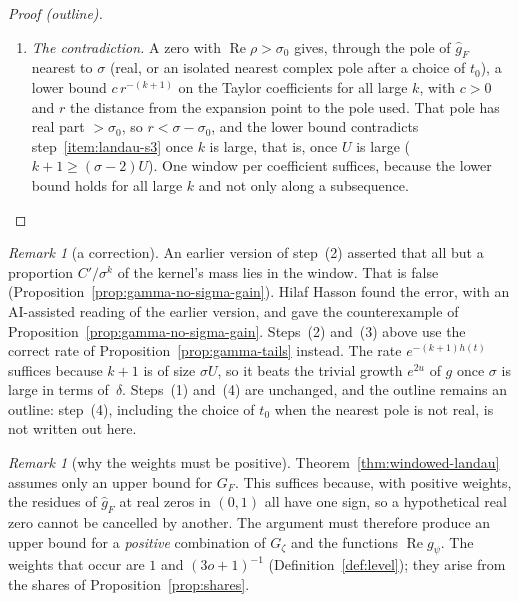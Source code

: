 \documentclass[11pt]{amsbook}
\theoremstyle{plain}
\theoremstyle{definition}
\theoremstyle{remark}
\newtheorem{remark}[theorem]{Remark}
\numberwithin{equation}{section}
\numberwithin{figure}{chapter}
\numberwithin{table}{chapter}
\newcommand{\Gz}{G_{\zeta}}
\begin{document}
\begin{proof}[Proof (outline)]
\begin{enumerate}[label=(\arabic*)]
\[+\frac{4Ae^{-(k+1)h(t)}}{(\sigma-2)^{k+1}} .
\]
If $\sigma$ is so large in terms of $\delta$ that
$e^{-h(t)}(\sigma-\sigma_0)<\sigma-2$, the right side is at most
$C''(\sigma-\sigma_0)^{-(k+1)}$ with $C''=2C+4A$.
\item \emph{The contradiction.} A zero with $\operatorname{Re}\rho>
\sigma_0$ gives, through the pole of $\widehat g_F$ nearest to
$\sigma$ (real, or an isolated nearest complex pole after a choice
of $t_0$), a lower bound $c\,r^{-(k+1)}$ on the Taylor coefficients
for all large $k$, with $c>0$ and $r$ the distance from the expansion
point to the pole used. That pole has real part $>\sigma_0$, so
$r<\sigma-\sigma_0$, and the lower bound contradicts
step~\ref{item:landau-s3} once $k$ is large, that is, once $U$ is
large ($k+1\ge(\sigma-2)U$). One window per coefficient suffices,
because the
lower bound holds for all large $k$ and not only along a subsequence.
\qedhere
\end{enumerate}
\end{proof}

\begin{remark}[a correction]\label{rem:gamma-correction}
An earlier version of step~(2) asserted that all but a proportion
$C'/\sigma^k$ of the kernel's mass lies in the window. That is false
(Proposition~\ref{prop:gamma-no-sigma-gain}). Hilaf Hasson found the
error, with an AI-assisted reading of the earlier version, and gave
the counterexample of Proposition~\ref{prop:gamma-no-sigma-gain}.
Steps~(2) and~(3) above use the correct rate of
Proposition~\ref{prop:gamma-tails} instead. The rate
$e^{-(k+1)h(t)}$ suffices because $k+1$ is of size $\sigma U$, so it
beats the trivial growth $e^{2u}$ of $g$ once $\sigma$ is large in
terms of~$\delta$. Steps~(1) and~(4) are unchanged, and the outline
remains an outline: step~(4), including the choice of $t_0$ when the
nearest pole is not real, is not written out here.
\end{remark}

\begin{remark}[why the weights must be positive]\label{rem:positivity}
Theorem~\ref{thm:windowed-landau} assumes only an upper bound for
$G_F$. This suffices because, with positive weights, the residues of
$\widehat g_F$ at real zeros in $(0,1)$ all have one sign, so a
hypothetical real zero cannot be cancelled by another. The argument
must therefore produce an upper bound for a \emph{positive}
combination of $\Gz$ and the functions $\operatorname{Re}g_\psi$. The
weights that occur are $1$ and $(3o+1)^{-1}$
(Definition~\ref{def:level}); they arise from the shares of
Proposition~\ref{prop:shares}.
\end{remark}
\end{document}
